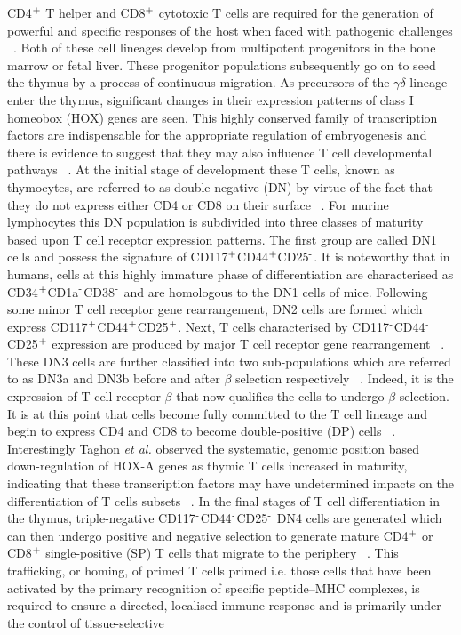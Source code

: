 CD4$\textsuperscript{+}$ T helper and CD8$\textsuperscript{+}$ cytotoxic T cells are required for the generation of powerful and specific responses of the host when faced with pathogenic challenges ~\autocite{Won2016}. Both of these cell lineages develop from multipotent progenitors in the bone marrow or fetal liver. These progenitor populations subsequently go on to seed the thymus by a process of continuous migration. As precursors of the $\gamma \delta$ lineage enter the thymus, significant changes in their expression patterns of class I homeobox (HOX) genes are seen. This highly conserved family of transcription factors are indispensable for the appropriate regulation of embryogenesis and there is evidence to suggest that they may also influence T cell developmental pathways ~\autocite{Tag2003}. At the initial stage of development these T cells, known as thymocytes, are referred to as double negative (DN) by virtue of the fact that they do not express either CD4 or CD8 on their surface ~\autocite{Wee2006}. For murine lymphocytes this DN population is subdivided into three classes of maturity based upon T cell receptor expression patterns. The first group are called DN1 cells and possess the signature of CD117$\textsuperscript{+}$CD44$\textsuperscript{+}$CD25$\textsuperscript{-}$. It is noteworthy that in humans, cells at this highly immature phase of differentiation are characterised as CD34$\textsuperscript{+}$CD1a$\textsuperscript{-}$CD38$\textsuperscript{-}$ and are homologous to the DN1 cells of mice. Following some minor T cell receptor gene rearrangement, DN2 cells are formed which express CD117$\textsuperscript{+}$CD44$\textsuperscript{+}$CD25$\textsuperscript{+}$. Next, T cells characterised by CD117$\textsuperscript{-}$CD44$\textsuperscript{-}$CD25$\textsuperscript{+}$ expression are produced by major T cell receptor gene rearrangement ~\autocite{Koya2012}. These DN3 cells are further classified into two sub-populations which are referred to as DN3a and DN3b before and after $\beta$ selection respectively ~\autocite{Koya2012}. Indeed, it is the expression of T cell receptor $\beta$ that now qualifies the cells to undergo $\beta$-selection. It is at this point that cells become fully committed to the T cell lineage and begin to express CD4 and CD8 to become double-positive (DP) cells ~\autocite{Koya2012}. Interestingly Taghon \textit{et al.} observed the systematic, genomic position based down-regulation of HOX-A genes as thymic T cells increased in maturity, indicating that these transcription factors may have undetermined impacts on the differentiation of T cells subsets ~\autocite{Tag2003}. In the final stages of T cell differentiation in the thymus, triple-negative CD117$\textsuperscript{-}$CD44$\textsuperscript{-}$CD25$\textsuperscript{-}$ DN4 cells are generated which can then undergo positive and negative selection to generate mature CD4$\textsuperscript{+}$ or CD8$\textsuperscript{+}$ single-positive (SP) T cells that migrate to the periphery ~\autocite{Wee2006,Won2016,Koya2012}. This trafficking, or homing, of primed T cells primed i.e. those cells that have been activated by the primary recognition of specific peptide–MHC complexes, is required to ensure a directed, localised immune response and is primarily under the control of tissue-selective 